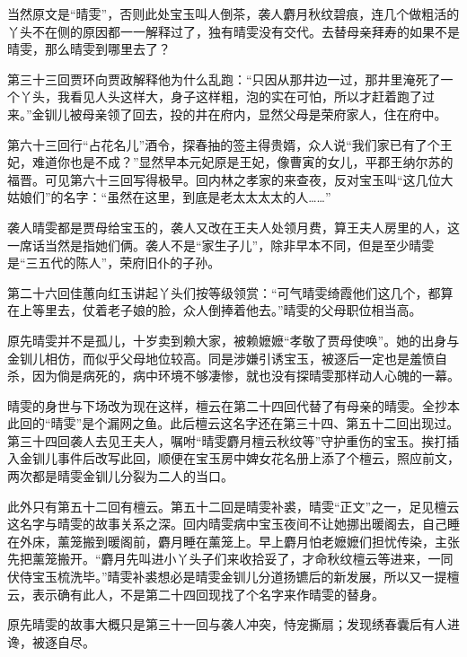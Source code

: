 \par 当然原文是“晴雯”，否则此处宝玉叫人倒茶，袭人麝月秋纹碧痕，连几个做粗活的丫头不在侧的原因都一一解释过了，独有晴雯没有交代。去替母亲拜寿的如果不是晴雯，那么晴雯到哪里去了？
\par 第三十三回贾环向贾政解释他为什么乱跑：“只因从那井边一过，那井里淹死了一个丫头，我看见人头这样大，身子这样粗，泡的实在可怕，所以才赶着跑了过来。”金钏儿被母亲领了回去，投的井在府内，显然父母是荣府家人，住在府中。
\par 第六十三回行“占花名儿”酒令，探春抽的签主得贵婿，众人说“我们家已有了个王妃，难道你也是不成？”显然早本元妃原是王妃，像曹寅的女儿，平郡王纳尔苏的福晋。可见第六十三回写得极早。回内林之孝家的来查夜，反对宝玉叫“这几位大姑娘们”的名字：“虽然在这里，到底是老太太太太的人……”
\par 袭人晴雯都是贾母给宝玉的，袭人又改在王夫人处领月费，算王夫人房里的人，这一席话当然是指她们俩。袭人不是“家生子儿”，除非早本不同，但是至少晴雯是“三五代的陈人”，荣府旧仆的子孙。
\par 第二十六回佳蕙向红玉讲起丫头们按等级领赏：“可气晴雯绮霞他们这几个，都算在上等里去，仗着老子娘的脸，众人倒捧着他去。”晴雯的父母职位相当高。
\par 原先晴雯并不是孤儿，十岁卖到赖大家，被赖嬷嬷“孝敬了贾母使唤”。她的出身与金钏儿相仿，而似乎父母地位较高。同是涉嫌引诱宝玉，被逐后一定也是羞愤自杀，因为倘是病死的，病中环境不够凄惨，就也没有探晴雯那样动人心魄的一幕。
\par 晴雯的身世与下场改为现在这样，檀云在第二十四回代替了有母亲的晴雯。全抄本此回的“晴雯”是个漏网之鱼。此后檀云这名字还在第三十四、第五十二回出现过。第三十四回袭人去见王夫人，嘱咐“晴雯麝月檀云秋纹等”守护重伤的宝玉。挨打插入金钏儿事件后改写此回，顺便在宝玉房中婢女花名册上添了个檀云，照应前文，两次都是晴雯金钏儿分裂为二人的当口。
\par 此外只有第五十二回有檀云。第五十二回是晴雯补裘，晴雯“正文”之一，足见檀云这名字与晴雯的故事关系之深。回内晴雯病中宝玉夜间不让她挪出暖阁去，自己睡在外床，薰笼搬到暖阁前，麝月睡在薰笼上。早上麝月怕老嬷嬷们担忧传染，主张先把薰笼搬开。“麝月先叫进小丫头子们来收拾妥了，才命秋纹檀云等进来，一同伏侍宝玉梳洗毕。”晴雯补裘想必是晴雯金钏儿分道扬镳后的新发展，所以又一提檀云，表示确有此人，不是第二十四回现找了个名字来作晴雯的替身。
\par 原先晴雯的故事大概只是第三十一回与袭人冲突，恃宠撕扇；发现绣春囊后有人进谗，被逐自尽。
